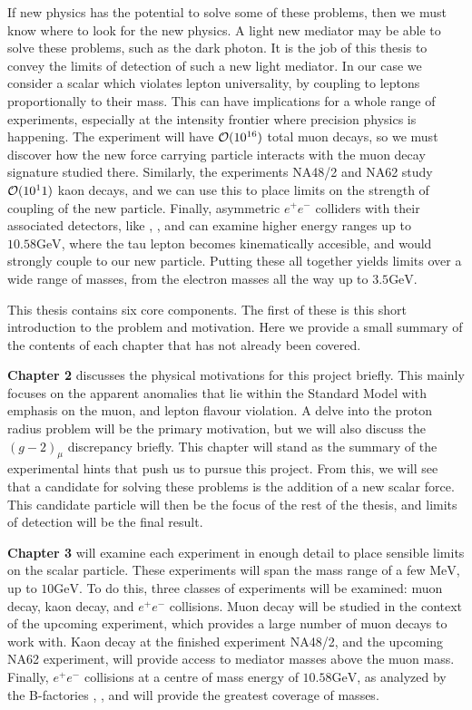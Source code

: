 If new physics has the potential to solve some of these problems, then we must know where to look for the new physics.
A light new mediator may be able to solve these problems, such as the dark photon.
It is the job of this thesis to convey the limits of detection of such a new light mediator.
In our case we consider a scalar which violates lepton universality, by coupling to leptons proportionally to their mass.
This can have implications for a whole range of experiments, especially at the intensity frontier where precision physics is happening.
The experiment \mueee will have $\operatorname{\mathcal{O}}(10^{16})$ total muon decays, so we must discover how the new force carrying particle interacts with the muon decay signature studied there.
Similarly, the experiments NA48/2 and NA62 study $\operatorname{\mathcal{O}}(10^11)$ kaon decays, and we can use this to place limits on the strength of coupling of the new particle.
Finally, asymmetric $e^+ e^-$ colliders with their associated detectors, like \babar, \belle, and \belletwo can examine higher energy ranges up to $10.58\textrm{GeV}$, where the tau lepton becomes kinematically accesible, and would strongly couple to our new particle.
Putting these all together yields limits over a wide range of masses, from the electron masses all the way up to $3.5\textrm{GeV}$.

This thesis contains six core components.
The first of these is this short introduction to the problem and motivation.
Here we provide a small summary of the contents of each chapter that has not already been covered.

\textbf{Chapter 2} discusses the physical motivations for this project briefly.
This mainly focuses on the apparent anomalies that lie within the Standard Model with emphasis on the muon, and lepton flavour violation.
A delve into the proton radius problem will be the primary motivation, but we will also discuss the $(g-2)_\mu$ discrepancy briefly.
This chapter will stand as the summary of the experimental hints that push us to pursue this project.
From this, we will see that a candidate for solving these problems is the addition of a new scalar force.
This candidate particle will then be the focus of the rest of the thesis, and limits of detection will be the final result.

\textbf{Chapter 3} will examine each experiment in enough detail to place sensible limits on the scalar particle.
These experiments will span the mass range of a few $\textrm{MeV}$, up to $10\textrm{GeV}$.
To do this, three classes of experiments will be examined: muon decay, kaon decay, and $e^+ e^-$ collisions.
Muon decay will be studied in the context of the upcoming \mueee experiment, which provides a large number of muon decays to work with.
Kaon decay at the finished experiment NA48/2, and the upcoming NA62 experiment, will provide access to mediator masses above the muon mass.
Finally, $e^+ e^-$ collisions at a centre of mass energy of $10.58\textrm{GeV}$, as analyzed by the B-factories \babar, \belle, and \belleii will provide the greatest coverage of masses.

